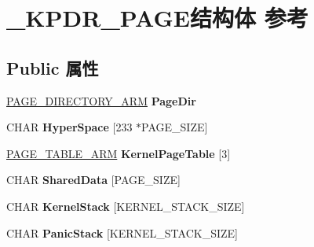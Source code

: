 \hypertarget{struct___k_p_d_r___p_a_g_e}{}\section{\+\_\+\+K\+P\+D\+R\+\_\+\+P\+A\+G\+E结构体 参考}
\label{struct___k_p_d_r___p_a_g_e}
\subsection*{Public 属性}
\begin{DoxyCompactItemize}
\item 
\mbox{\label{struct___k_p_d_r___p_a_g_e_ac74281dc17ee51cf4479e9a6f3e99eb3}} 
\hyperlink{struct___p_a_g_e___d_i_r_e_c_t_o_r_y___a_r_m}{P\+A\+G\+E\+\_\+\+D\+I\+R\+E\+C\+T\+O\+R\+Y\+\_\+\+A\+RM} {\bfseries Page\+Dir}
\item 
\mbox{\label{struct___k_p_d_r___p_a_g_e_ab31fde81a14ab3565022ce045700f49f}} 
C\+H\+AR {\bfseries Hyper\+Space} \mbox{[}233 $\ast$P\+A\+G\+E\+\_\+\+S\+I\+ZE\mbox{]}
\item 
\mbox{\label{struct___k_p_d_r___p_a_g_e_a2445abc798729e1e78bf9801bb6225ed}} 
\hyperlink{struct___p_a_g_e___t_a_b_l_e___a_r_m}{P\+A\+G\+E\+\_\+\+T\+A\+B\+L\+E\+\_\+\+A\+RM} {\bfseries Kernel\+Page\+Table} \mbox{[}3\mbox{]}
\item 
\mbox{\label{struct___k_p_d_r___p_a_g_e_afa8cfa79497261515681238d601833bc}} 
C\+H\+AR {\bfseries Shared\+Data} \mbox{[}P\+A\+G\+E\+\_\+\+S\+I\+ZE\mbox{]}
\item 
\mbox{\label{struct___k_p_d_r___p_a_g_e_a228aa53e0fe1d3182611249922ab1305}} 
C\+H\+AR {\bfseries Kernel\+Stack} \mbox{[}K\+E\+R\+N\+E\+L\+\_\+\+S\+T\+A\+C\+K\+\_\+\+S\+I\+ZE\mbox{]}
\item 
\mbox{\label{struct___k_p_d_r___p_a_g_e_adf61edc51b49568c62168e354e420280}} 
C\+H\+AR {\bfseries Panic\+Stack} \mbox{[}K\+E\+R\+N\+E\+L\+\_\+\+S\+T\+A\+C\+K\+\_\+\+S\+I\+ZE\mbox{]}
\item 
\mbox{\label{struct___k_p_d_r___p_a_g_e_a94a12cfd5fb3d5dae9083d97d103706b}} 

\end{DoxyCompactItemize}
